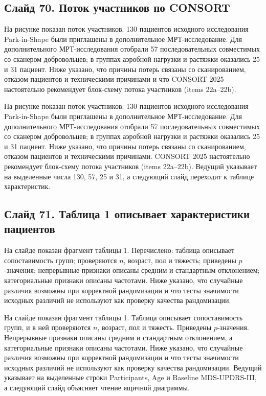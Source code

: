 \documentclass[11pt,a4paper]{article}
\begin{document}
\subsection*{Слайд 70. Поток участников по CONSORT}
\begin{onslide}
На рисунке показан поток участников. 130 пациентов исходного исследования Park-in-Shape были приглашены в дополнительное МРТ-исследование. Для дополнительного МРТ-исследования отобрали 57 последовательных совместимых со сканером добровольцев; в группах аэробной нагрузки и растяжки оказались 25 и 31 пациент. Ниже указано, что причины потерь связаны со сканированием, отказом пациентов и техническими причинами и что CONSORT 2025 настоятельно рекомендует блок-схему потока участников (items 22a–22b).
\end{onslide}
На рисунке показан поток участников. 130 пациентов исходного исследования Park-in-Shape были приглашены в дополнительное МРТ-исследование. Для дополнительного МРТ-исследования отобрали 57 последовательных совместимых со сканером добровольцев; в группах аэробной нагрузки и растяжки оказались 25 и 31 пациент. Ниже указано, что причины потерь связаны со сканированием, отказом пациентов и техническими причинами. CONSORT 2025 настоятельно рекомендует блок-схему потока участников (items 22a--22b). Ведущий указывает на выделенные числа 130, 57, 25 и 31, а следующий слайд переходит к таблице характеристик.

\subsection*{Слайд 71. Таблица 1 описывает характеристики пациентов}
\begin{onslide}
На слайде показан фрагмент таблицы 1. Перечислено: таблица описывает сопоставимость групп; проверяются $n$, возраст, пол и тяжесть; приведены $p$-значения; непрерывные признаки описаны средним и стандартным отклонением; категориальные признаки описаны частотами. Ниже указано, что случайные различия возможны при корректной рандомизации и что тесты значимости исходных различий не используют как проверку качества рандомизации.
\end{onslide}
На слайде показан фрагмент таблицы 1. Таблица описывает сопоставимость групп, и в ней проверяются $n$, возраст, пол и тяжесть. Приведены $p$-значения. Непрерывные признаки описаны средним и стандартным отклонением, а категориальные признаки описаны частотами. Ниже указано, что случайные различия возможны при корректной рандомизации и что тесты значимости исходных различий не используют как проверку качества рандомизации. Ведущий указывает на выделенные строки Participants, Age и Baseline MDS-UPDRS-III, а следующий слайд объясняет чтение ящичной диаграммы.
\end{document}
